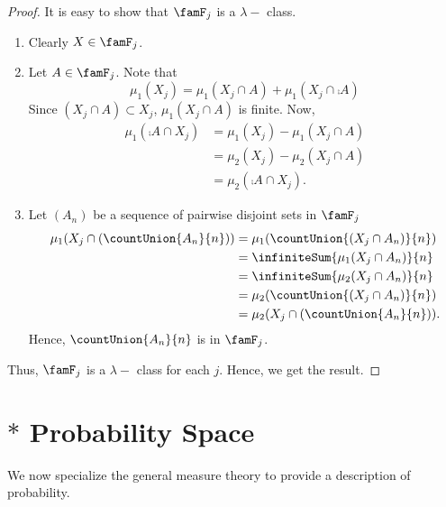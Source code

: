 \begin{proof}
    It is easy to show that $\famF_{j}$ is a $\lambda-$ class.
    \begin{enumerate}
	\item Clearly $X \in \famF_{j}$.
	\item Let $A \in \famF_{j}$. Note that
	    \[\mu_1(X_j) = \mu_1(X_j \cap A) + \mu_1(X_j \cap \comp{A})\]
	    Since $(X_j\cap A) \subset X_j$, $\mu_1(X_j\cap A)$ is finite.
	    Now,
	    \begin{align*}
		\mu_1(\comp{A}\cap X_j) &= \mu_1(X_j) - \mu_1(X_j \cap A) \\
		& = \mu_2(X_j) - \mu_2(X_j \cap A) \\
		& = \mu_2(\comp{A}\cap X_j).
	    \end{align*}
	\item Let $(A_n)$ be a sequence of pairwise disjoint sets in $\famF_{j}$
	    \begin{align*}
		\mu_1(X_j \cap \left(\countUnion{A_n}{n}\right)) &= \mu_1(\countUnion{(X_j\cap A_n)}{n}) \\
		& = \infiniteSum{\mu_1(X_j\cap A_n)}{n} \\
		& = \infiniteSum{\mu_2(X_j\cap A_n)}{n} \\
		& = \mu_2(\countUnion{(X_j\cap A_n)}{n}) \\
		& = \mu_2(X_j \cap \left(\countUnion{A_n}{n}\right)).
	    \end{align*}
	    Hence, $\countUnion{A_n}{n}$ is in $\famF_j$.
    \end{enumerate}
    Thus, $\famF_j$ is a $\lambda-$ class for each $j$. Hence, we get the result.
\end{proof}
\section{{$\ast$} Probability Space}
We now specialize the general measure theory to provide a description of probability.

